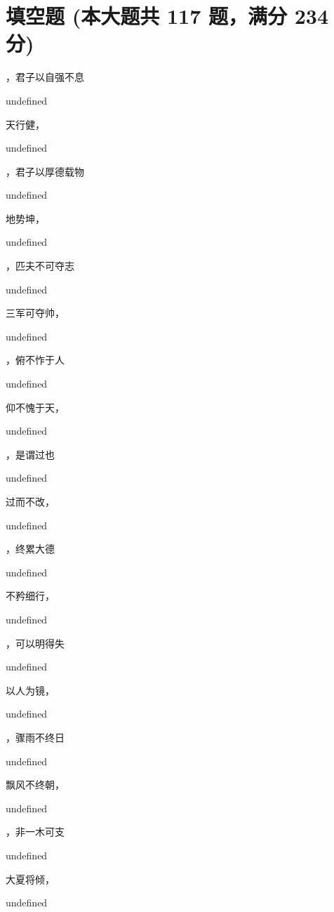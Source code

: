 \documentclass[12pt, a4paper, addpoints]{exam}
\begin{document}
\section{\normalsize{填空题 (本大题共 117 题，满分 234 分)}}
\hspace{1.5cm}
\begin{multicols}{2}
\begin{questions}
\question[2] \fillin，君子以自强不息

undefined

\question[2] 天行健，\fillin

undefined

\question[2] \fillin，君子以厚德载物

undefined

\question[2] 地势坤，\fillin

undefined

\question[2] \fillin，匹夫不可夺志

undefined

\question[2] 三军可夺帅，\fillin

undefined

\question[2] \fillin，俯不怍于人

undefined

\question[2] 仰不愧于天，\fillin

undefined

\question[2] \fillin，是谓过也

undefined

\question[2] 过而不改，\fillin

undefined

\question[2] \fillin，终累大德

undefined

\question[2] 不矜细行，\fillin

undefined

\question[2] \fillin，可以明得失

undefined

\question[2] 以人为镜，\fillin

undefined

\question[2] \fillin，骤雨不终日

undefined

\question[2] 飘风不终朝，\fillin

undefined

\question[2] \fillin，非一木可支

undefined

\question[2] 大夏将倾，\fillin

undefined


\end{questions}
\end{multicols}
\end{document}
